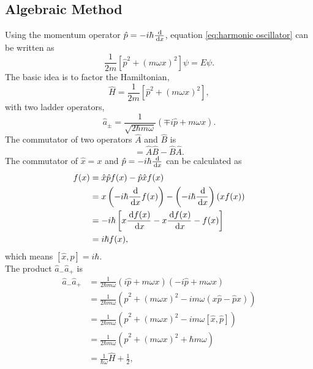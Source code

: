 \documentclass[en, oneside]{vivi}
\begin{document}
\subsection{Algebraic Method}
Using the momentum operator $\hat{p} = -i\hbar \frac{\dif}{\dif x}$, equation \eqref{eq:harmonic oscillator} can be written as
\begin{equation}
    \frac{1}{2m} \left[ \hat p^2 + (m \omega x)^2 \right] \psi = E\psi.
\end{equation}
The basic idea is to factor the Hamiltonian,
\begin{equation}
    \hat H = \frac{1}{2m} \left[ \hat p^2 + (m \omega x)^2 \right],
\end{equation}
with two ladder operators,
\begin{equation} \label{eq:ladder operators}
    \hat a_\pm = \frac{1}{\sqrt{2\hbar m \omega}} \left( \mp i \hat p + m \omega x \right).
\end{equation}
The commutator of two operators $\hat A$ and $\hat B$ is
\begin{equation}
    [\hat A, \hat B] = \hat A \hat B - \hat B \hat A.
\end{equation}
The commutator of $\hat x = x$ and $\hat p = -i\hbar \frac{\dif}{\dif x}$ can be calculated as
\begin{align}
    [\hat x, \hat p] f(x) &= \hat x \hat p f(x) - \hat p \hat x f(x)\\
    &= x \left( -i\hbar \frac{\dif}{\dif x} f(x) \right) - \left( -i\hbar \frac{\dif}{\dif x} \right) (x f(x))\\
    &= -i\hbar \left[ x \frac{\dif f(x)}{\dif x} - x \frac{\dif f(x)}{\dif x} - f(x) \right]\\
    &= i\hbar f(x),
\end{align}
which means $[\hat x, \hat p] = i\hbar$.\\
The product $\hat a_- \hat a_+$ is
\begin{align}
    \hat a_- \hat a_+ &= \frac{1}{2\hbar m \omega} \left( i\hat p + m \omega x \right) \left( -i\hat p + m \omega x \right)\\
    &= \frac{1}{2\hbar m \omega} \left( \hat p^2 + (m \omega x)^2 - i m \omega (x \hat p - \hat p x) \right)\\
    &= \frac{1}{2\hbar m \omega} \left( \hat p^2 + (m \omega x)^2 - i m \omega [\hat x, \hat p] \right)\\
    &= \frac{1}{2\hbar m \omega} \left( \hat p^2 + (m \omega x)^2 + \hbar m \omega \right)\\
    &= \frac{1}{\hbar \omega} \hat H + \frac{1}{2},
\end{align}
\end{document}
